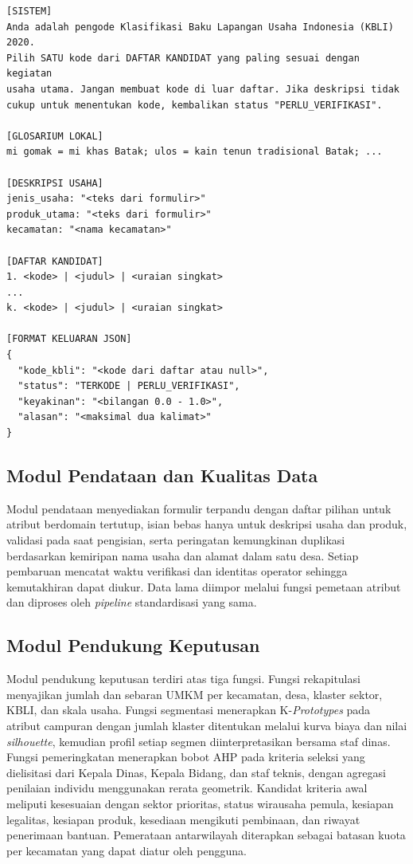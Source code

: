 \documentclass[12pt,a4paper]{report}
\begin{document}
\begin{lstlisting}[language={}, caption={Rancangan Struktur \textit{Prompt} dan Keluaran Standardisasi KBLI}, label={lst:prompt}]
[SISTEM]
Anda adalah pengode Klasifikasi Baku Lapangan Usaha Indonesia (KBLI) 2020.
Pilih SATU kode dari DAFTAR KANDIDAT yang paling sesuai dengan kegiatan
usaha utama. Jangan membuat kode di luar daftar. Jika deskripsi tidak
cukup untuk menentukan kode, kembalikan status "PERLU_VERIFIKASI".

[GLOSARIUM LOKAL]
mi gomak = mi khas Batak; ulos = kain tenun tradisional Batak; ...

[DESKRIPSI USAHA]
jenis_usaha: "<teks dari formulir>"
produk_utama: "<teks dari formulir>"
kecamatan: "<nama kecamatan>"

[DAFTAR KANDIDAT]
1. <kode> | <judul> | <uraian singkat>
...
k. <kode> | <judul> | <uraian singkat>

[FORMAT KELUARAN JSON]
{
  "kode_kbli": "<kode dari daftar atau null>",
  "status": "TERKODE | PERLU_VERIFIKASI",
  "keyakinan": "<bilangan 0.0 - 1.0>",
  "alasan": "<maksimal dua kalimat>"
}
\end{lstlisting}

\subsection{Modul Pendataan dan Kualitas Data}

Modul pendataan menyediakan formulir terpandu dengan daftar pilihan untuk atribut berdomain tertutup, isian bebas hanya untuk deskripsi usaha dan produk, validasi pada saat pengisian, serta peringatan kemungkinan duplikasi berdasarkan kemiripan nama usaha dan alamat dalam satu desa. Setiap pembaruan mencatat waktu verifikasi dan identitas operator sehingga kemutakhiran dapat diukur. Data lama diimpor melalui fungsi pemetaan atribut dan diproses oleh \textit{pipeline} standardisasi yang sama.

\subsection{Modul Pendukung Keputusan}

Modul pendukung keputusan terdiri atas tiga fungsi. Fungsi rekapitulasi menyajikan jumlah dan sebaran UMKM per kecamatan, desa, klaster sektor, KBLI, dan skala usaha. Fungsi segmentasi menerapkan K-\textit{Prototypes} pada atribut campuran dengan jumlah klaster ditentukan melalui kurva biaya dan nilai \textit{silhouette}, kemudian profil setiap segmen diinterpretasikan bersama staf dinas. Fungsi pemeringkatan menerapkan bobot AHP pada kriteria seleksi yang dielisitasi dari Kepala Dinas, Kepala Bidang, dan staf teknis, dengan agregasi penilaian individu menggunakan rerata geometrik. Kandidat kriteria awal meliputi kesesuaian dengan sektor prioritas, status wirausaha pemula, kesiapan legalitas, kesiapan produk, kesediaan mengikuti pembinaan, dan riwayat penerimaan bantuan. Pemerataan antarwilayah diterapkan sebagai batasan kuota per kecamatan yang dapat diatur oleh pengguna.
\end{document}
